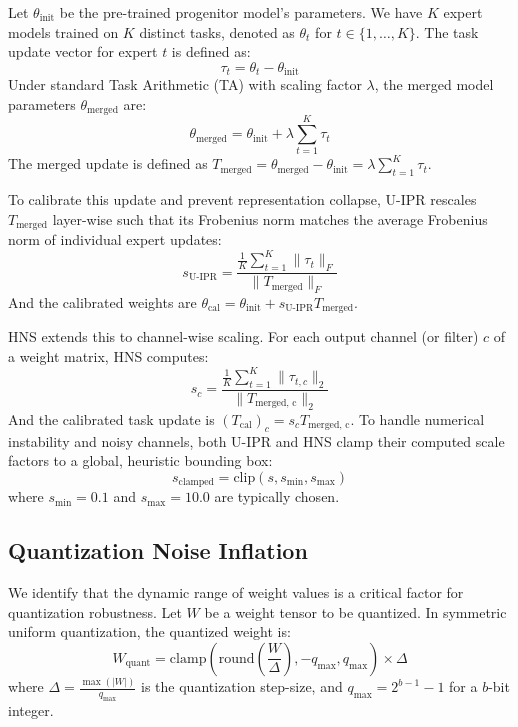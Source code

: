 \documentclass{article}
\theoremstyle{plain}
\theoremstyle{definition}
\theoremstyle{remark}
\begin{document}
Let $\theta_{\text{init}}$ be the pre-trained progenitor model's parameters. We have $K$ expert models trained on $K$ distinct tasks, denoted as $\theta_t$ for $t \in \{1, \dots, K\}$. The task update vector for expert $t$ is defined as:
\begin{equation}
    \tau_t = \theta_t - \theta_{\text{init}}
\end{equation}
Under standard Task Arithmetic (TA) with scaling factor $\lambda$, the merged model parameters $\theta_{\text{merged}}$ are:
\begin{equation}
    \theta_{\text{merged}} = \theta_{\text{init}} + \lambda \sum_{t=1}^{K} \tau_t
\end{equation}
The merged update is defined as $T_{\text{merged}} = \theta_{\text{merged}} - \theta_{\text{init}} = \lambda \sum_{t=1}^{K} \tau_t$.

To calibrate this update and prevent representation collapse, U-IPR \cite{submission9} rescales $T_{\text{merged}}$ layer-wise such that its Frobenius norm matches the average Frobenius norm of individual expert updates:
\begin{equation}
    s_{\text{U-IPR}} = \frac{\frac{1}{K} \sum_{t=1}^{K} \|\tau_t\|_F}{\|T_{\text{merged}}\|_F}
\end{equation}
And the calibrated weights are $\theta_{\text{cal}} = \theta_{\text{init}} + s_{\text{U-IPR}} T_{\text{merged}}$.

HNS \cite{submission7} extends this to channel-wise scaling. For each output channel (or filter) $c$ of a weight matrix, HNS computes:
\begin{equation}
    s_c = \frac{\frac{1}{K} \sum_{t=1}^{K} \|\tau_{t, c}\|_2}{\|T_{\text{merged, c}}\|_2}
\end{equation}
And the calibrated task update is $(T_{\text{cal}})_c = s_c T_{\text{merged, c}}$. To handle numerical instability and noisy channels, both U-IPR and HNS clamp their computed scale factors to a global, heuristic bounding box:
\begin{equation}
    s_{\text{clamped}} = \text{clip}(s, s_{\text{min}}, s_{\text{max}})
\end{equation}
where $s_{\text{min}} = 0.1$ and $s_{\text{max}} = 10.0$ are typically chosen.

\subsection{Quantization Noise Inflation}
We identify that the dynamic range of weight values is a critical factor for quantization robustness. Let $W$ be a weight tensor to be quantized. In symmetric uniform quantization, the quantized weight is:
\begin{equation}
    W_{\text{quant}} = \text{clamp}\left(\text{round}\left(\frac{W}{\Delta}\right), -q_{\text{max}}, q_{\text{max}}\right) \times \Delta
\end{equation}
where $\Delta = \frac{\max(|W|)}{q_{\text{max}}}$ is the quantization step-size, and $q_{\text{max}} = 2^{b-1}-1$ for a $b$-bit integer.
\end{document}
